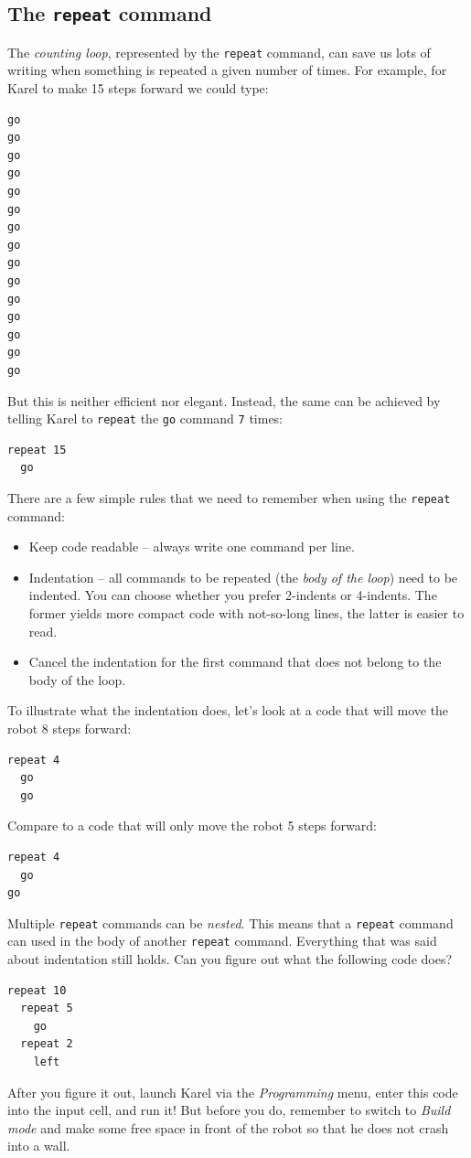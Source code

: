 \documentclass[article,A4,12pt]{llncs}
\begin{document}
{{\subsection{The {\tt repeat} command}

The {\em counting loop}, represented by the {\tt repeat} command, can save 
us lots of writing when something is repeated a given number of times. 
For example, for Karel to make 15 steps forward we could type:

\begin{verbatim}
go
go
go
go
go
go
go
go
go
go
go
go
go
go
go
\end{verbatim}
But this is neither efficient nor elegant. Instead, the same can be
achieved by telling Karel to {\tt repeat} the {\tt go} command {\tt 7} times:

\begin{verbatim}
repeat 15
  go
\end{verbatim}
There are a few simple rules that we need to remember when using the {\tt repeat} command:

\begin{itemize}
\item Keep code readable -- always write one command per line.
\item Indentation -- all commands to be repeated (the {\em body of the loop}) need to be indented. You can
      choose whether you prefer 2-indents or 4-indents. The former yields more compact 
      code with not-so-long lines, the latter is easier to read. 
\item Cancel the indentation for the first command that does not belong to the body of the loop.
\end{itemize}
To illustrate what the indentation does, let's look at a code that will move the robot 8 steps forward:

\begin{verbatim}
repeat 4
  go
  go
\end{verbatim}
Compare to a code that will only move the robot 5 steps forward:

\begin{verbatim}
repeat 4
  go
go
\end{verbatim}
Multiple {\tt repeat} commands can be {\em nested}. This means that a {\tt repeat} command 
can used in the body of another {\tt repeat} command. Everything that was said about indentation 
still holds. Can you figure out what the following code does?

\begin{verbatim}
repeat 10
  repeat 5
    go
  repeat 2
    left
\end{verbatim}
After you figure it out, launch Karel via the {\em Programming} menu, enter this code into
the input cell, and run it! But before you do, remember to switch to {\em Build mode} and make 
some free space in front of the robot 
so that he does not crash into a wall.

}}
\end{document}
